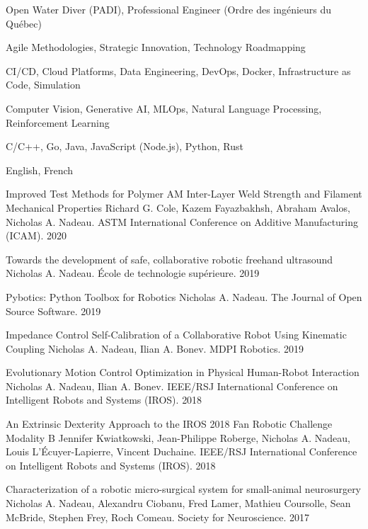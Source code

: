 \documentclass[11pt, letterpaper]{awesome-cv}
\begin{document}
\begin{cvskills}
    {
        Open Water Diver (PADI),
        Professional Engineer (Ordre des ingénieurs du Québec)
    }

    {
        Agile Methodologies,
        Strategic Innovation,
        Technology Roadmapping
    }

    {
        CI/CD,
        Cloud Platforms,
        Data Engineering,
        DevOps,
        Docker,
        Infrastructure as Code,
        Simulation
    }

    {
        Computer Vision,
        Generative AI,
        MLOps,
        Natural Language Processing,
        Reinforcement Learning
    }

    {
        C/C++,
        Go,
        Java,
        JavaScript (Node.js),
        Python,
        Rust
    }

    {
        English, French
    }
\end{cvskills}

\begin{cvhonors}
    \cvhonor
    {Improved Test Methods for Polymer AM Inter-Layer Weld Strength and Filament Mechanical Properties}
    {Richard G. Cole, Kazem Fayazbakhsh, Abraham Avalos, Nicholas A. Nadeau. ASTM International Conference on Additive Manufacturing (ICAM).}
    {}
    {2020}

    \cvhonor
    {Towards the development of safe, collaborative robotic freehand ultrasound}
    {Nicholas A. Nadeau. École de technologie supérieure.}
    {}
    {2019}

    \cvhonor
    {Pybotics: Python Toolbox for Robotics}
    {Nicholas A. Nadeau. The Journal of Open Source Software.}
    {}
    {2019}

    \cvhonor
    {Impedance Control Self-Calibration of a Collaborative Robot Using Kinematic Coupling}
    {Nicholas A. Nadeau, Ilian A. Bonev. MDPI Robotics.}
    {}
    {2019}

    \cvhonor
    {Evolutionary Motion Control Optimization in Physical Human-Robot Interaction}
    {Nicholas A. Nadeau, Ilian A. Bonev. IEEE/RSJ International Conference on Intelligent Robots and Systems (IROS).}
    {}
    {2018}

    \cvhonor
    {An Extrinsic Dexterity Approach to the IROS 2018 Fan Robotic Challenge Modality B}
    {Jennifer Kwiatkowski, Jean-Philippe Roberge, Nicholas A. Nadeau, Louis L'Écuyer-Lapierre, Vincent Duchaine. IEEE/RSJ International Conference on Intelligent Robots and Systems (IROS).}
    {}
    {2018}

    \cvhonor
    {Characterization of a robotic micro-surgical system for small-animal neurosurgery}
    {Nicholas A. Nadeau, Alexandru Ciobanu, Fred Lamer, Mathieu Coursolle, Sean McBride, Stephen Frey, Roch Comeau. Society for Neuroscience.}
    {}
    {2017}
\end{cvhonors}
\end{document}
